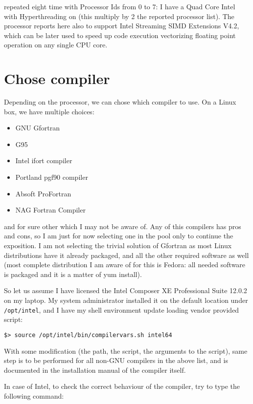 repeated eight time with Processor Ids from 0 to 7: I have a Quad Core Intel
with Hyperthreading on (this multiply by 2 the reported processor list).
The processor reports here also to support Intel Streaming SIMD Extensions V4.2,
which can be later used to speed up code execution vectorizing floating point
operation on any single CPU core.

\section{Chose compiler}

Depending on the processor, we can chose which compiler to use. On a Linux box,
we have multiple choices:

\begin{itemize}
\item GNU Gfortran
\item G95
\item Intel ifort compiler
\item Portland pgf90 compiler
\item Absoft ProFortran
\item NAG Fortran Compiler
\end{itemize}

and for sure other which I may not be aware of. Any of this compilers has pros
and cons, so I am just for now selecting one in the pool only to continue the
exposition. I am not selecting the trivial solution of Gfortran as most
Linux distributions have it already packaged, and all the other required
software as well (most complete distribution I am aware of for this is Fedora:
all needed software is packaged and it is a matter of yum install).

So let us assume I have licensed the Intel Composer XE Professional Suite
12.0.2 on my laptop. My system administrator installed it on the default
location under \verb=/opt/intel=, and I have my shell environment update
loading vendor provided script:

\begin{Verbatim}
$> source /opt/intel/bin/compilervars.sh intel64
\end{Verbatim}

With some modification (the path, the script, the arguments to the script),
same step is to be performed for all non-GNU compilers in the above list, and
is documented in the installation manual of the compiler itself.

In case of Intel, to check the correct behaviour of the compiler, try to
type the following command:

